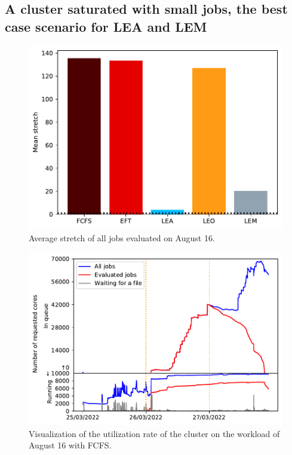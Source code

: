 \documentclass[conference,10pt]{IEEEtran}
\begin{document}
\subsection{A cluster saturated with small jobs, the best case scenario for LEA and LEM}

\begin{figure}[tb]\centering\includegraphics[scale=0.47]{../MBSS/plot/Results_FCFS_Score_Backfill_2022-08-16->2022-08-16_V10000_Mean_Stretch_450_128_32_256_4_1024.pdf}\caption{Average stretch of all jobs evaluated on August 16.}\end{figure}
\begin{figure}[H]\centering\includegraphics[scale=0.47]{../MBSS/plot/Cluster_usage/2022-08-16->2022-08-16_V10000_Fcfs_Used_nodes_Reduced_450_128_32_256_4_1024_core_by_core.pdf}\caption{Visualization of the utilization rate of the cluster on the workload of August 16 with FCFS.}\end{figure}
\end{document}
